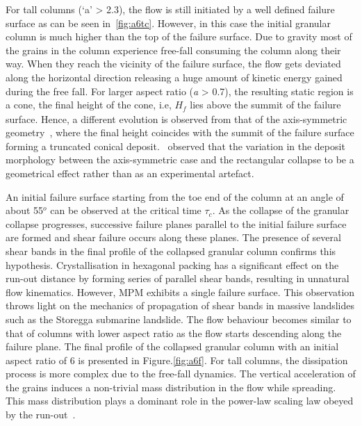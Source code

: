 For tall columns (`a' > 2.3), the flow is still initiated by a well defined 
failure surface as can be seen in~\cref{fig:a6tc}. However, in this case the 
initial granular column is much higher than the top of the failure surface. Due 
to gravity most of the grains in the column experience free-fall 
consuming the column along their way. When they reach the vicinity of the 
failure surface, the flow gets deviated along the horizontal direction 
releasing a huge amount of kinetic energy gained during the free fall. For 
larger aspect ratio (\textit{a} > 0.7), the resulting static region is a cone, 
the final height of the cone, i.e, $\textit{H}_{\textit{f}}$ lies above the 
summit of the failure surface. Hence, a different evolution is observed from 
that of the axis-symmetric geometry~\citep{Lube2005}, where the final height 
coincides with the summit of the failure surface forming a truncated conical 
deposit.~\citet{Lajeunesse2004} observed that the variation in the deposit 
morphology between the axis-symmetric case and the rectangular collapse to be a 
geometrical effect rather than as an experimental artefact. 

An initial failure surface starting from the toe end 
of the column at an angle of about 55$^{o}$ can be observed at the critical 
time $\tau_{c}$. As the collapse of the granular collapse progresses, 
successive failure planes parallel to the initial failure surface are formed 
and shear failure occurs along these planes. The presence of several shear 
bands in the final profile of the collapsed granular column confirms this 
hypothesis. Crystallisation in hexagonal packing has a significant effect on 
the run-out distance by forming series of parallel shear bands, resulting in 
unnatural flow kinematics. However, MPM exhibits a single failure surface. This 
observation throws light on 
the mechanics of propagation of shear bands in massive landslides such as the 
Storegga submarine landslide. The flow behaviour becomes similar to that of 
columns with lower aspect ratio as the flow starts descending along the failure 
plane. The final profile of the collapsed granular column with an initial 
aspect ratio of 6 is presented in Figure.\ref{fig:a6f}. For tall columns, the 
dissipation process is more complex due to the free-fall dynamics. The vertical 
acceleration of the grains induces a non-trivial mass distribution in the flow 
while spreading. This mass distribution plays a dominant role in the power-law 
scaling law obeyed by the run-out~\citep{Staron2007a}.


